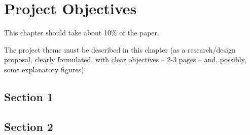 \chapter{Project Objectives}\label{ch:obiective}
\pagestyle{fancy}

{\noindent\color{blue}This chapter should take about 10\% of the paper.\\}

The project theme must be described in this chapter (as a research/design proposal, clearly formulated, with clear objectives – 2-3 pages – and, possibly, some explanatory figures).



\section{Section 1}
\section{Section 2}

\lipsum[2-11]
